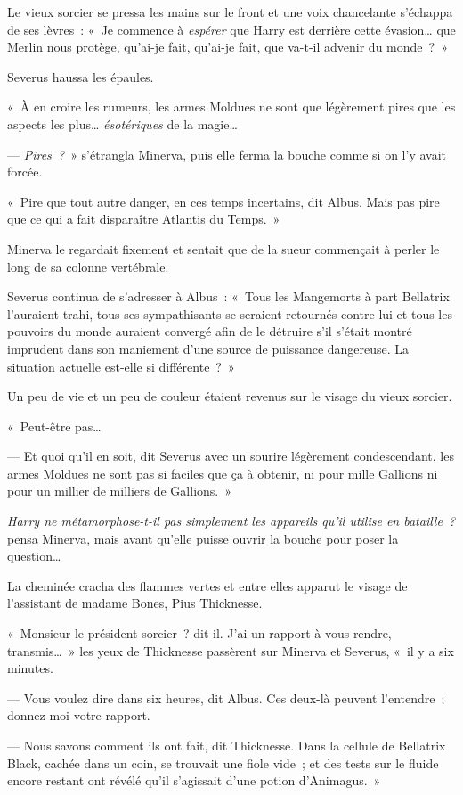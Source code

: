 Le vieux sorcier se pressa les mains sur le front et une voix chancelante s'échappa de ses lèvres~: «~Je commence à \emph{espérer} que Harry est derrière cette évasion… que Merlin nous protège, qu'ai-je fait, qu'ai-je fait, que va-t-il advenir du monde~?~»

Severus haussa les épaules.

«~À en croire les rumeurs, les armes Moldues ne sont que légèrement pires que les aspects les plus…
\emph{ésotériques} de la magie…

--- \emph{Pires~?}~» s'étrangla Minerva, puis elle ferma la bouche comme si on l'y avait forcée.

«~Pire que tout autre danger, en ces temps incertains, dit Albus.
Mais pas pire que ce qui a fait disparaître Atlantis du Temps.~»

Minerva le regardait fixement et sentait que de la sueur commençait à perler le long de sa colonne vertébrale.

Severus continua de s'adresser à Albus~: «~Tous les Mangemorts à part Bellatrix l'auraient trahi, tous ses sympathisants se seraient retournés contre lui et tous les pouvoirs du monde auraient convergé afin de le détruire s'il s'était montré imprudent dans son maniement d'une source de puissance dangereuse.
La situation actuelle est-elle si différente~?~»

Un peu de vie et un peu de couleur étaient revenus sur le visage du vieux sorcier.

«~Peut-être pas…

--- Et quoi qu'il en soit, dit Severus avec un sourire légèrement condescendant, les armes Moldues ne sont pas si faciles que ça à obtenir, ni pour mille Gallions ni pour un millier de milliers de Gallions.~»

\emph{Harry ne métamorphose-t-il pas simplement les appareils qu'il utilise en bataille~?} pensa Minerva, mais avant qu'elle puisse ouvrir la bouche pour poser la question…

La cheminée cracha des flammes vertes et entre elles apparut le visage de l'assistant de madame Bones, Pius Thicknesse.

«~Monsieur le président sorcier~? dit-il.
J'ai un rapport à vous rendre, transmis…~»
les yeux de Thicknesse passèrent sur Minerva et Severus, «~il y a six minutes.

--- Vous voulez dire dans six heures, dit Albus.
Ces deux-là peuvent l'entendre~; donnez-moi votre rapport.

--- Nous savons comment ils ont fait, dit Thicknesse.
Dans la cellule de Bellatrix Black, cachée dans un coin, se trouvait une fiole vide~; et des tests sur le fluide encore restant ont révélé qu'il s'agissait d'une potion d'Animagus.~»

